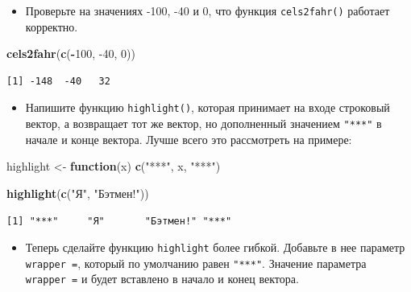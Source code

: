 \documentclass[
]{book}
\newenvironment{Shaded}{\begin{snugshade}}{\end{snugshade}}
\newcommand{\ControlFlowTok}[1]{\textcolor[rgb]{0.13,0.29,0.53}{\textbf{#1}}}
\newcommand{\DecValTok}[1]{\textcolor[rgb]{0.00,0.00,0.81}{#1}}
\newcommand{\KeywordTok}[1]{\textcolor[rgb]{0.13,0.29,0.53}{\textbf{#1}}}
\newcommand{\NormalTok}[1]{#1}
\newcommand{\OperatorTok}[1]{\textcolor[rgb]{0.81,0.36,0.00}{\textbf{#1}}}
\newcommand{\StringTok}[1]{\textcolor[rgb]{0.31,0.60,0.02}{#1}}
\providecommand{\tightlist}{%
  \setlength{\itemsep}{0pt}\setlength{\parskip}{0pt}}
\begin{document}
\begin{itemize}
\tightlist
\item
  Проверьте на значениях -100, -40 и 0, что функция \texttt{cels2fahr()} работает корректно.
\end{itemize}

\begin{Shaded}
\begin{Highlighting}[]
\KeywordTok{cels2fahr}\NormalTok{(}\KeywordTok{c}\NormalTok{(}\OperatorTok{-}\DecValTok{100}\NormalTok{, }\DecValTok{-40}\NormalTok{, }\DecValTok{0}\NormalTok{))}
\end{Highlighting}
\end{Shaded}

\begin{verbatim}
[1] -148  -40   32
\end{verbatim}

\begin{itemize}
\tightlist
\item
  Напишите функцию \texttt{highlight()}, которая принимает на входе строковый вектор, а возвращает тот же вектор, но дополненный значением \texttt{"***"} в начале и конце вектора. Лучше всего это рассмотреть на примере:
\end{itemize}

\begin{Shaded}
\begin{Highlighting}[]
\NormalTok{highlight <-}\StringTok{ }\ControlFlowTok{function}\NormalTok{(x) }\KeywordTok{c}\NormalTok{(}\StringTok{"***"}\NormalTok{, x, }\StringTok{"***"}\NormalTok{)}
\end{Highlighting}
\end{Shaded}

\begin{Shaded}
\begin{Highlighting}[]
\KeywordTok{highlight}\NormalTok{(}\KeywordTok{c}\NormalTok{(}\StringTok{"Я"}\NormalTok{, }\StringTok{"Бэтмен!"}\NormalTok{))}
\end{Highlighting}
\end{Shaded}

\begin{verbatim}
[1] "***"     "Я"       "Бэтмен!" "***"    
\end{verbatim}

\begin{itemize}
\tightlist
\item
  Теперь сделайте функцию \texttt{highlight} более гибкой. Добавьте в нее параметр \texttt{wrapper\ =}, который по умолчанию равен \texttt{"***"}. Значение параметра \texttt{wrapper\ =} и будет вставлено в начало и конец вектора.
\end{itemize}
\end{document}

